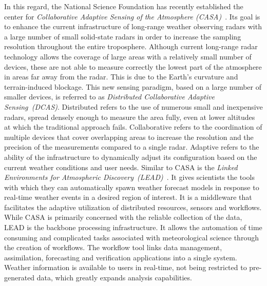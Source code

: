 In this regard, the National Science Foundation has recently established the center for
\textit{Collaborative Adaptive Sensing of the Atmosphere (CASA)}~\cite{casa}. Its goal is to
enhance the current infrastructure of long-range weather observing radars with a large number of small
solid-state radars in order to increase the sampling resolution throughout the entire
troposphere.
Although current \mbox{long-range} radar technology allows the coverage of large areas with a relatively
small number of devices, these are not able to measure correctly the lowest part of the atmosphere in
areas far away from the radar. This is due to the Earth's curvature and terrain-induced blockage.  This
new sensing paradigm, based on a large number of smaller devices, is referred to as \emph{Distributed
Collaborative Adaptive Sensing~(DCAS)}. Distributed refers to the use of numerous small and inexpensive
radars, spread densely enough to measure the area fully, even at lower altitudes at which the traditional
approach fails.
Collaborative refers to the coordination of multiple devices that cover overlapping areas to increase
the resolution and the precision of the measurements compared to a single radar. Adaptive refers to the
ability of the infrastructure to dynamically adjust its configuration based on the current weather
conditions and user needs.
Similar to CASA is the \emph{Linked Environments for Atmospheric
Discovery~(LEAD)}~\cite{lead}. It gives scientists the tools with which they can automatically spawn
weather forecast models in response to real-time weather events in a desired region of interest. It is a
middleware that facilitates the adaptive utilization of distributed resources, sensors and workflows.
While CASA is primarily concerned with the reliable collection of the data, LEAD is the backbone
processing infrastructure. It allows the automation of time consuming and complicated tasks associated
with meteorological science through the creation of workflows. The workflow tool links data management,
assimilation, forecasting and verification applications into a single system. Weather information is
available to users in real-time, not being restricted to pre-generated data, which greatly expands
analysis capabilities.

